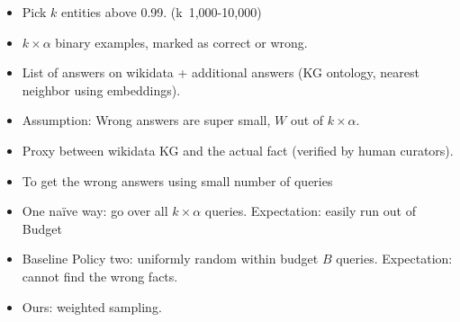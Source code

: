 \begin{itemize}
    \item Pick $k$ entities above 0.99. (k~1,000-10,000)
    \item $k\times\alpha$ binary examples, marked as correct or wrong.
    \item List of answers on wikidata + additional answers (KG ontology, nearest neighbor using embeddings).
    \item Assumption: Wrong answers are super small, $W$ out of $k\times \alpha$.
    \item Proxy between wikidata KG and the actual fact (verified by human curators).
    \item To get the wrong answers using small number of queries
    \item One na\"ive way: go over all $k\times \alpha$ queries. Expectation: easily run out of Budget
    \item Baseline Policy two: uniformly random within budget $B$ queries. Expectation: cannot find the wrong facts.
    \item Ours: weighted sampling. 
    
\end{itemize}